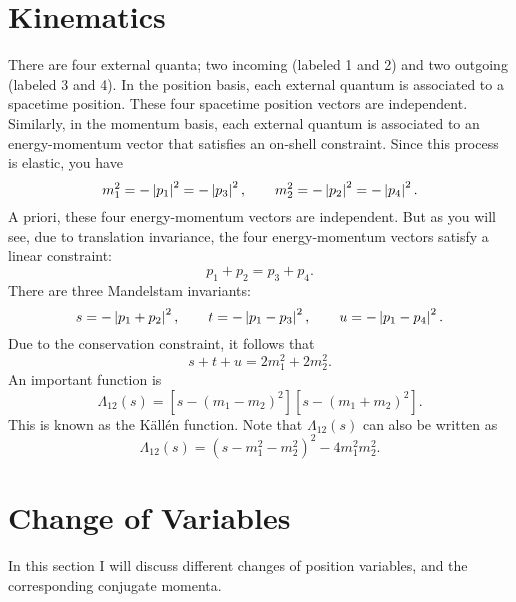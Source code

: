 \section{Kinematics}
There are four external quanta; two incoming (labeled 1 and 2) and two outgoing (labeled 3 and 4). In the position basis, each external quantum is associated to a spacetime position. These four spacetime position vectors are independent. Similarly, in the momentum basis, each external quantum is associated to an energy-momentum vector that satisfies an on-shell constraint. Since this process is elastic, you have
\begin{equation}
	m_{1}^{2} = -\left\lvert p_{1} \right\rvert^{2} = -\left\lvert p_{3} \right\rvert^{2}, \qquad m_{2}^{2} = -\left\lvert p_{2} \right\rvert^{2} = -\left\lvert p_{4} \right\rvert^{2}.
\end{equation}
A priori, these four energy-momentum vectors are independent. But as you will see, due to translation invariance, the four energy-momentum vectors satisfy a linear constraint:
\begin{equation}
	p_{1} + p_{2} = p_{3} + p_{4}.
\end{equation}
There are three Mandelstam invariants:
\begin{equation}
	s = -\left\lvert p_{1} + p_{2} \right\rvert^{2}, \qquad t = -\left\lvert p_{1} - p_{3} \right\rvert^{2}, \qquad u = -\left\lvert p_{1} - p_{4} \right\rvert^{2}.
\end{equation}
Due to the conservation constraint, it follows that
\begin{equation}
	s + t + u = 2 m_{1}^{2} + 2 m_{2}^{2}.
\end{equation}
An important function is
\begin{equation}
	\Lambda_{12}(s) = [s - (m_{1} - m_{2})^{2}] [s - (m_{1} + m_{2})^{2}].
\end{equation}
This is known as the K\"{a}ll\'{e}n function. Note that $\Lambda_{12}(s)$ can also be written as
\begin{equation}
	\Lambda_{12}(s) = (s - m_{1}^{2} - m_{2}^{2})^{2} - 4 m_{1}^{2} m_{2}^{2}.
\end{equation}
\section{Change of Variables}
In this section I will discuss different changes of position variables, and the corresponding conjugate momenta.
